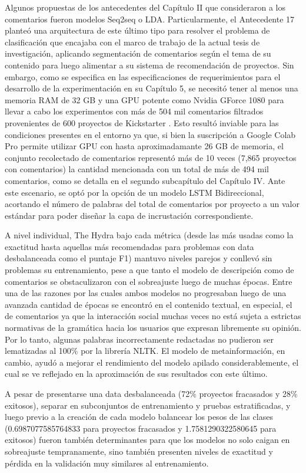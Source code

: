 Algunos propuestas de los antecedentes del Capítulo II que consideraron a los comentarios fueron modelos Seq2seq o LDA. Particularmente, el Antecedente 17 planteó una arquitectura de este último tipo para resolver el problema de clasificación que encajaba con el marco de trabajo de la actual tesis de investigación, aplicando segmentación de comentarios según el tema de su contenido para luego alimentar a su sistema de recomendación de proyectos. Sin embargo, como se especifica en las especificaciones de requerimientos para el desarrollo de la experimentación en su Capítulo 5, se necesitó tener al menos una memoria RAM de 32 GB y una GPU potente como Nvidia GForce 1080 para llevar a cabo los experimentos con más de 504 mil comentarios filtrados provenientes de 600 proyectos de Kickstarter \parencite{pr_shafqat2019topicpredictions}. Esto resultó inviable para las condiciones presentes en el entorno ya que, si bien la suscripción a Google Colab Pro permite utilizar GPU con hasta aproximadamante 26 GB de memoria, el conjunto recolectado de comentarios representó más de 10 veces (7,865 proyectos con comentarios) la cantidad mencionada con un total de más de 494 mil comentarios, como se detalla en el segundo subcapítulo del Capítulo IV. Ante este escenario, se optó por la opción de un modelo LSTM Bidireccional, acortando el número de palabras del total de comentarios por proyecto a un valor estándar para poder diseñar la capa de incrustación correspondiente.

A nivel individual, The Hydra bajo cada métrica (desde las más usadas como la exactitud hasta aquellas más recomendadas para problemas con data desbalanceada como el puntaje F1) mantuvo niveles parejos y conllevó sin problemas su entrenamiento, pese a que tanto el modelo de descripción como de comentarios se obstaculizaron con el sobreajuste luego de muchas épocas. Entre una de las razones por las cuales ambos modelos no progresaban luego de una avanzada cantidad de épocas se encontró en el contenido textual, en especial, el de comentarios ya que la interacción social muchas veces no está sujeta a estrictas normativas de la gramática hacia los usuarios que expresan libremente su opinión. Por lo tanto, algunas palabras incorrectamente redactadas no pudieron ser lematizadas al 100\% por la librería NLTK. El modelo de metainformación, en cambio, ayudó a mejorar el rendimiento del modelo apilado considerablemente, el cual se ve reflejado en la aproximación de sus resultados con este último.

A pesar de presentarse una data desbalanceada (72\% proyectos fracasados y 28\% exitosos), separar en subconjuntos de entrenamiento y pruebas estratificadas, y luego previo a la creación de cada modelo balancear los pesos de las clases (0.6987077585764833 para proyectos fracasados y 1.7581290322580645 para exitosos) fueron también determinantes para que los modelos no solo caigan en sobreajuste tempranamente, sino también presenten niveles de exactitud y pérdida en la validación muy similares al entrenamiento.

